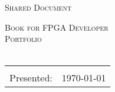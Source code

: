 \begin{titlepage}
	\setcounter{page}{-1}
	\begin{center}
		\textsc{Shared Document}\\[6ex]
		
		\vfill
		\vfill
		
		\textsc{\Huge Book for FPGA Developer}\\[4ex]
		\textsc{\Huge Portfolio}\\[4ex]
		
		\textsc{}\\[3ex]
		\vspace{20pt}
		
		\vfill
		\vfill
		
		\begin{tabular}{rl}\hline\\
			Presented:                & \quad \today \\[1.5ex]
		\end{tabular}
	\end{center}
	
	\clearpage
	\pagestyle{empty}
	
\end{titlepage}